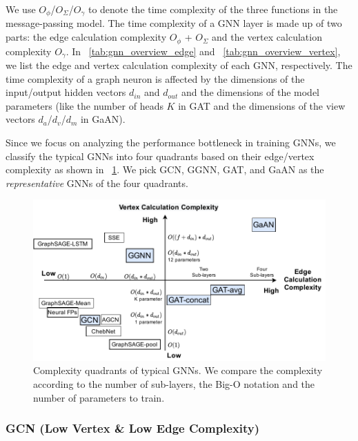 We use $O_\phi$/$O_\Sigma$/$O_\gamma$ to denote the time complexity of the three functions in the message-passing model.
The time complexity of a GNN layer is made up of two parts: the edge calculation complexity $O_\phi$ + $O_\Sigma$ and the vertex calculation complexity $O_\gamma$.
%
In \tablename~\ref{tab:gnn_overview_edge} and \tablename~\ref{tab:gnn_overview_vertex}, we list the edge and vertex calculation complexity of each GNN, respectively.
The time complexity of a graph neuron is affected by the dimensions of the input/output hidden vectors $d_{in}$ and $d_{out}$ and the dimensions of the model parameters (like the number of heads $K$ in GAT and the dimensions of the view vectors $d_a$/$d_v$/$d_m$ in GaAN).

Since we focus on analyzing the performance bottleneck in training GNNs, we classify the typical GNNs into four quadrants based on their edge/vertex complexity as shown in \figurename~\ref{fig:gnn_complexity_quadrant}. We pick GCN, GGNN, GAT, and GaAN as the \emph{representative} GNNs of the four quadrants.

\begin{figure}[h]
    \centering
    \includegraphics[width=0.7\columnwidth]{figs/illustration/GNN_complexity_quadrant.pdf}
    \caption{Complexity quadrants of typical GNNs. We compare the complexity according to the number of sub-layers, the Big-O notation and the number of parameters to train.}
    \label{fig:gnn_complexity_quadrant}
\end{figure}

\subsubsection{GCN (Low Vertex \& Low Edge Complexity)}

